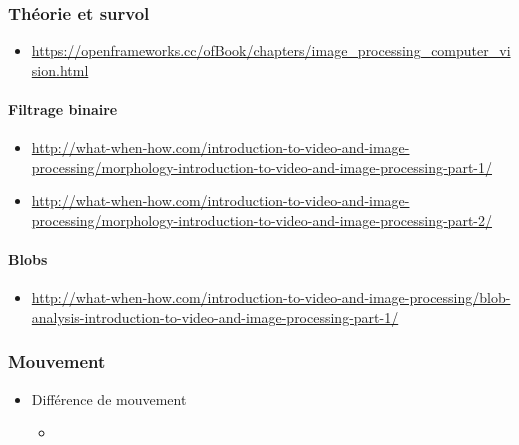 \documentclass[
  french,
]{book}
\providecommand{\tightlist}{%
  \setlength{\itemsep}{0pt}\setlength{\parskip}{0pt}}
\begin{document}
\hypertarget{thuxe9orie-et-survol}{%
\subsubsection{Théorie et survol}\label{thuxe9orie-et-survol}}

\begin{itemize}
\tightlist
\item
  \url{https://openframeworks.cc/ofBook/chapters/image_processing_computer_vision.html}
\end{itemize}

\hypertarget{filtrage-binaire}{%
\paragraph{Filtrage binaire}\label{filtrage-binaire}}

\begin{itemize}
\tightlist
\item
  \url{http://what-when-how.com/introduction-to-video-and-image-processing/morphology-introduction-to-video-and-image-processing-part-1/}
\item
  \url{http://what-when-how.com/introduction-to-video-and-image-processing/morphology-introduction-to-video-and-image-processing-part-2/}
\end{itemize}

\hypertarget{blobs}{%
\paragraph{Blobs}\label{blobs}}

\begin{itemize}
\tightlist
\item
  \url{http://what-when-how.com/introduction-to-video-and-image-processing/blob-analysis-introduction-to-video-and-image-processing-part-1/}
\end{itemize}

\hypertarget{interagir_mouvement}{%
\subsubsection{Mouvement}\label{interagir_mouvement}}

\begin{itemize}
\tightlist
\item
  Différence de mouvement

  \begin{itemize}
  \tightlist
  \item
  \end{itemize}
\end{itemize}
\end{document}
